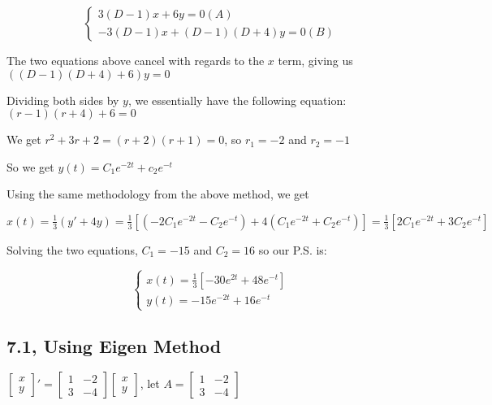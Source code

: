 \documentclass{article}
\begin{document}
\noindent $$
\begin{cases}
3(D - 1)x + 6y = 0 (A)\\
-3(D - 1)x + (D - 1)(D + 4)y = 0 (B)
\end{cases}
$$ \par\vspace{0.25cm}

\noindent The two equations above cancel with regards to the $x$ term, giving us $((D - 1)(D + 4) + 6)y = 0$ \par
\noindent Dividing both sides by $y$, we essentially have the following equation: $(r - 1)(r + 4) + 6 = 0$ \par
\noindent We get $r^{2} + 3r + 2 = (r + 2)(r + 1) = 0$, so $r_{1} = -2$ and $r_{2} = -1$ \par
\noindent So we get $y(t) = C_{1}e^{-2t} + c_{2}e^{-t}$ \par
\noindent Using the same methodology from the above method, we get \par
\noindent $x(t) = \frac{1}{3}(y' + 4y) = \frac{1}{3}[(-2C_{1}e^{-2t} - C_{2}e^{-t}) + 4(C_{1}e^{-2t} + C_{2}e^{-t})] = \frac{1}{3}[2C_{1}e^{-2t} + 3C_{2}e^{-t}]$ \par
\noindent Solving the two equations, $C_{1} = -15$ and $C_{2} = 16$ so our P.S. is: \par

\noindent $$
\begin{cases}
x(t) = \frac{1}{3}[-30e^{2t} + 48e^{-t}] \\
y(t) = -15e^{-2t} + 16e^{-t}
\end{cases}
$$ 
\par\vspace{0.50cm}

\subsection{7.1, Using Eigen Method}
$
\begin{bmatrix}
    x\\
    y
\end{bmatrix}' 
 = 
\begin{bmatrix}
    1 & -2 \\
    3 & -4
\end{bmatrix}
\begin{bmatrix}
    x \\
    y
\end{bmatrix}
$, let $A = 
\begin{bmatrix}
    1 & -2 \\
    3 & -4
\end{bmatrix}$
\par\vspace{0.25cm}
\end{document}
